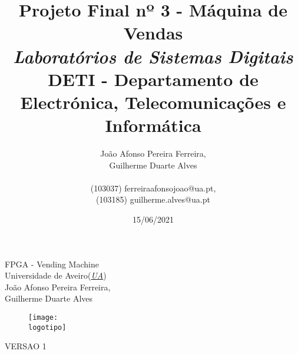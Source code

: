 \documentclass{report}
\begin{document}
%
\def\titulo{FPGA - Vending Machine}
\def\data{15/06/2021}
\def\autores{João Afonso Pereira Ferreira, \\ Guilherme Duarte Alves }
\def\autorescontactos{(103037) ferreiraafonsojoao@ua.pt, \\ (103185) guilherme.alves@ua.pt}
\def\versao{VERSAO 1}
\def\departamento{DETI - Departamento de Electrónica, Telecomunicações e Informática}
\def\empresa{Universidade de Aveiro(\emph{\href{https://www.ua.pt}{UA}})}
\def\logotipo{imagens/ua.pdf}
%
%
\renewcommand{\contentsname}{Índice}
\begin{titlepage}

\begin{center}
%
\vspace*{50mm}
%
{\Huge \titulo}\\ 
%
\vspace{10mm}
%
{\Large \empresa}\\
%
\vspace{10mm}
%
{\LARGE \autores}\\ 
%
\vspace{30mm}
%
\begin{figure}[h]
\center
\texttt{[image: \\logotipo]}
\end{figure}
%
\vspace{30mm}
\end{center}
%
\begin{flushright}
\versao
\end{flushright}
\end{titlepage}

\title{%
{\Huge\textbf{Projeto Final nº 3 - Máquina de Vendas}}\\
{\LARGE\textit{Laboratórios de Sistemas Digitais}} \\ 
{\Large \departamento\\}
}
%
\author{%
    \autores \\ 
    \\\autorescontactos
}
%
\date{\data}
%
\maketitle


\tableofcontents
\listoftables     %
\listoffigures    %


\clearpage
{}
\end{document}
